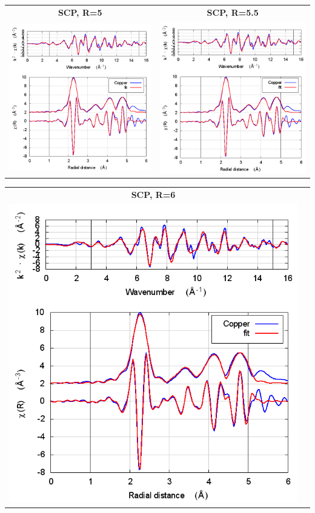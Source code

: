 \documentclass[11pt]{article}
\begin{document}
\begin{center}
  \begin{tabular}{cc}
    \textbf{SCP, R=5} & \textbf{SCP, R=5.5} \\
    \includegraphics[width=.45\linewidth]{Copper/scf/fit_withSCF_5.png} &
    \includegraphics[width=.45\linewidth]{Copper/scf/fit_withSCF_5.5.png} \\
  \end{tabular}
\end{center}
\begin{center}
  \begin{tabular}{cc}
    \textbf{SCP, R=6} &\\
    \includegraphics[width=.45\linewidth]{Copper/scf/fit_withSCF_6.png}&\\
  \end{tabular}
\end{center}
\end{document}
